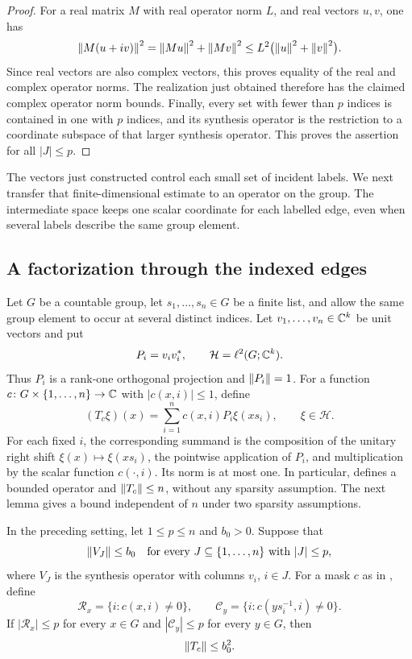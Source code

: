 \begin{proof}
For a real matrix $M$ with real operator norm $L$, and real vectors
$u,v$, one has
\[
 \left\lVert M(u+iv)\right\rVert^2=\left\lVert Mu\right\rVert^2+\left\lVert Mv\right\rVert^2
 \le L^2\bigl(\left\lVert u\right\rVert^2+\left\lVert v\right\rVert^2\bigr).
\]
Since real vectors are also complex vectors, this proves equality of
the real and complex operator norms.  The realization just obtained
therefore has the claimed complex operator norm bounds.  Finally,
every set with fewer than $p$ indices is contained in one with $p$
indices, and its synthesis operator is the restriction to a coordinate
subspace of that larger synthesis operator.  This proves the assertion
for all $|J|\le p$.
\end{proof}

The vectors just constructed control each small set of incident labels.
We next transfer that finite-dimensional estimate to an operator on the
group. The intermediate space keeps one scalar coordinate for each
labelled edge, even when several labels describe the same group element.

\subsection{A factorization through the indexed edges}

Let $G$ be a countable group, let $s_1,\ldots,s_n\in G$ be a finite
list, and allow the same group element to occur at several distinct
indices.  Let $v_1,\ldots,v_n\in\mathbb C^k$ be unit vectors and put
\[
 P_i=v_i v_i^*,\qquad
 \mathcal H=\ell^2(G;\mathbb C^k).
\]
Thus $P_i$ is a rank-one orthogonal projection and
$\left\lVert P_i\right\rVert=1$.  For a function
$c\colon G\times\{1,\ldots,n\}\to\mathbb C$ with $|c(x,i)|\le1$, define
\begin{equation}
\label{eq:masked-operator}
 (T_c\xi)(x)=\sum_{i=1}^n c(x,i)P_i\xi(xs_i),
 \qquad \xi\in\mathcal H.
\end{equation}
For each fixed $i$, the corresponding summand is the composition of
the unitary right shift $\xi(x)\mapsto\xi(xs_i)$, the pointwise
application of $P_i$, and multiplication by the scalar function
$c(\cdot,i)$.  Its norm is at most one.  In particular,
 defines a bounded operator and
$\left\lVert T_c\right\rVert\le n$, without any sparsity assumption.  The next lemma
gives a bound independent of $n$ under two sparsity assumptions.

\begin{lemma}
\label{lem:masked}
In the preceding setting, let $1\le p\le n$ and $b_0>0$.  Suppose
that
\[
 \left\lVert V_J\right\rVert\le b_0
 \quad\text{for every }J\subseteq\{1,\ldots,n\}
 \text{ with }|J|\le p,
\]
where $V_J$ is the synthesis operator with columns $v_i$, $i\in J$.
For a mask $c$ as in , define
\[
 \mathcal R_x=\{i:c(x,i)\ne0\},\qquad
 \mathcal C_y=\{i:c(ys_i^{-1},i)\ne0\}.
\]
If $|\mathcal R_x|\le p$ for every $x\in G$ and $|\mathcal C_y|\le p$ for every
$y\in G$, then
\[
 \left\lVert T_c\right\rVert\le b_0^2.
\]
\end{lemma}

